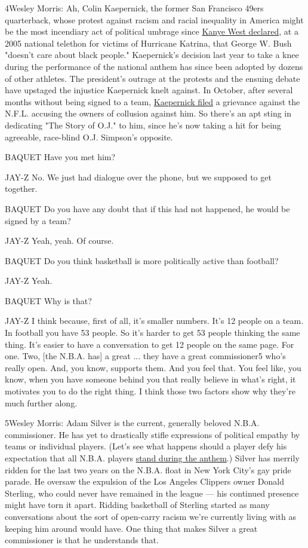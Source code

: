 4Wesley Morris: Ah, Colin Kaepernick, the former San Francisco 49ers
quarterback, whose protest against racism and racial inequality in
America might be the most incendiary act of political umbrage since
\href{https://www.youtube.com/watch?v=zIUzLpO1kxI}{Kanye West declared},
at a 2005 national telethon for victims of Hurricane Katrina, that
George W. Bush "doesn't care about black people." Kaepernick's decision
last year to take a knee during the performance of the national anthem
has since been adopted by dozens of other athletes. The president's
outrage at the protests and the ensuing debate have upstaged the
injustice Kaepernick knelt against. In October, after several months
without being signed to a team,
\href{https://www.nytimes3xbfgragh.onion/2017/10/15/sports/colin-kaepernick-nfl-collusion.html}{Kaepernick
filed} a grievance against the N.F.L. accusing the owners of collusion
against him. So there's an apt sting in dedicating "The Story of O.J."
to him, since he's now taking a hit for being agreeable, race-blind O.J.
Simpson's opposite.

BAQUET Have you met him?

JAY-Z No. We just had dialogue over the phone, but we supposed to get
together.

BAQUET Do you have any doubt that if this had not happened, he would be
signed by a team?

JAY-Z Yeah, yeah. Of course.

BAQUET Do you think basketball is more politically active than football?

JAY-Z Yeah.

BAQUET Why is that?

JAY-Z I think because, first of all, it's smaller numbers. It's 12
people on a team. In football you have 53 people. So it's harder to get
53 people thinking the same thing. It's easier to have a conversation to
get 12 people on the same page. For one. Two, {[}the N.B.A. has{]} a
great ... they have a great commissioner5 who's really open. And, you
know, supports them. And you feel that. You feel like, you know, when
you have someone behind you that really believe in what's right, it
motivates you to do the right thing. I think those two factors show why
they're much further along.

5Wesley Morris: Adam Silver is the current, generally beloved N.B.A.
commissioner. He has yet to drastically stifle expressions of political
empathy by teams or individual players. (Let's see what happens should a
player defy his expectation that all N.B.A. players
\href{https://www.nytimes3xbfgragh.onion/2017/09/28/sports/basketball/nba-adam-silver-anthem.html}{stand
during the anthem}.) Silver has merrily ridden for the last two years on
the N.B.A. float in New York City's gay pride parade. He oversaw the
expulsion of the Los Angeles Clippers owner Donald Sterling, who could
never have remained in the league --- his continued presence might have
torn it apart. Ridding basketball of Sterling started as many
conversations about the sort of open-carry racism we're currently living
with as keeping him around would have. One thing that makes Silver a
great commissioner is that he understands that.

